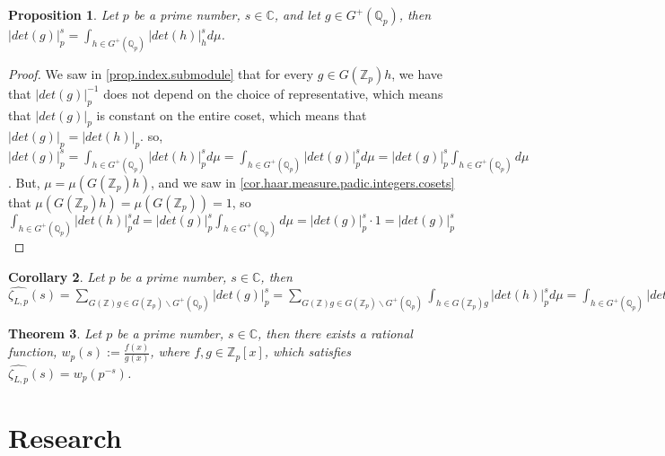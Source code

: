 \documentclass[12pt]{article}
\newtheorem{theorem}{Theorem}[subsection]
\newtheorem{proposition}[theorem]{Proposition}
\newtheorem{corollary}[theorem]{Corollary}
\begin{document}
\begin{proposition}
\label{prop.padic.integers.integral}
Let $p$ be a prime number, $s\in\mathbb{C}$, and let $g\in G^+(\mathbb{Q}_p)$, then $|det(g)|_p^s=\displaystyle\int_{h\in G^+(\mathbb{Q}_p)}|det(h)|_h^sd\mu$.
\end{proposition}
\begin{proof}
We saw in \ref{prop.index.submodule} that for every $g\in G(\mathbb{Z}_p)h$, we have that $|det(g)|_p^{-1}$ does not depend on the choice of representative, which means that $|det(g)|_p$ is constant on the entire coset, which means that $|det(g)|_p=|det(h)|_p$. so, $|det(g)|_p^s=\displaystyle\int_{h\in G^+(\mathbb{Q}_p)}|det(h)|_p^sd\mu=\displaystyle\int_{h\in G^+(\mathbb{Q}_p)}|det(g)|_p^sd\mu=|det(g)|_p^s\displaystyle\int_{h\in G^+(\mathbb{Q}_p)}d\mu$. But, $\mu=\mu(G(\mathbb{Z}_p)h)$, and we saw in \ref{cor.haar.measure.padic.integers.cosets} that $\mu(G(\mathbb{Z}_p)h)=\mu(G(\mathbb{Z}_p))=1$, so $\displaystyle\int_{h\in G^+(\mathbb{Q}_p)}|det(h)|_p^sd=|det(g)|_p^s\displaystyle\int_{h\in G^+(\mathbb{Q}_p)}d\mu=|det(g)|_p^s\cdot 1=|det(g)|_p^s$
\end{proof}
\begin{corollary}
\label{cor.proisomorphic.integral}
Let $p$ be a prime number, $s\in\mathbb{C}$, then $\widehat{\zeta_{L,p}}(s)=\displaystyle\sum_{G(\mathbb{Z})g\in G(\mathbb{Z}_p)\backslash G^+(\mathbb{Q}_p)}|det(g)|_p^s=\displaystyle\sum_{G(\mathbb{Z})g\in G(\mathbb{Z}_p)\backslash G^+(\mathbb{Q}_p)}\displaystyle\int_{h\in G(\mathbb{Z}_p)g}|det(h)|_p^s d\mu=\displaystyle\int_{h\in G^+(\mathbb{Q}_p)}|det(h)|_p^s d\mu$
\end{corollary}
\begin{theorem}
\label{thm.rational.function}
Let $p$ be a prime number, $s\in\mathbb{C}$, then there exists a rational function, $w_p(s):=\frac{f(x)}{g(x)}$, where $f,g\in\mathbb{Z}_p[x]$, which satisfies $\widehat{\zeta_{L,p}}(s)=w_p(p^{-s})$.
\end{theorem}
\section{Research}
\end{document}
